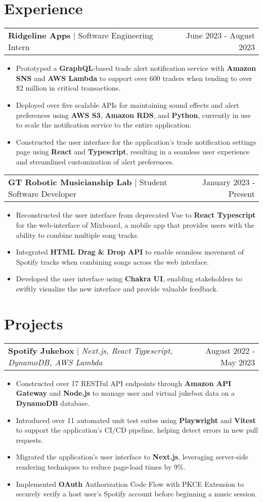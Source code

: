 \documentclass[letterpaper,11pt]{article}
\makeatletter
\newcommand{\resumeExperienceHeading}[3]{
    \begin{tabular*}{0.99\textwidth}[t]{l@{\extracolsep{\fill}}r}
      \textbf{#1} $\vert$ {#2} & {#3} \\
    \end{tabular*}\vspace{-3pt}
}
\newcommand{\resumeProjectHeading}[3]{
    \begin{tabular*}{0.97\textwidth}[t]{l@{\extracolsep{\fill}}r}
      \textbf{#1} $\vert$ \textit{#2}  & {#3}
    \end{tabular*}\vspace{-3pt}
}
\newcommand{\resumeItemListStart}{\begin{itemize}[noitemsep]\vspace{-4pt}}
\newcommand{\resumeItemListEnd}{\end{itemize}}
\makeatother
\begin{document}
\section{Experience}
  \resumeExperienceHeading{Ridgeline Apps}{Software Engineering Intern}{June 2023 - August 2023}
    \resumeItemListStart
      \item {Prototyped a \textbf{GraphQL}-based trade alert notification service with \textbf{Amazon SNS} and \textbf{AWS Lambda} to support over 600 traders when tending to over \$2 million in critical transactions.}
      \item {Deployed over five scalable APIs for maintaining sound effects and alert preferences using \textbf{AWS S3}, \textbf{Amazon RDS}, and \textbf{Python}, currently in use to scale the notification service to the entire application.}
      \item {Constructed the user interface for the application's trade notification settings page using \textbf{React} and \textbf{Typescript}, resulting in a seamless user experience and streamlined customization of alert preferences.}
    \resumeItemListEnd
  \resumeExperienceHeading{GT Robotic Musicianship Lab}{Student Software Developer}{January 2023 - Present}
    \resumeItemListStart
      \item {Reconstructed the user interface from deprecated Vue to \textbf{React Typescript} for the web-interface of Mixboard, a mobile app that provides users with the ability to combine multiple song tracks.}
      \item {Integrated \textbf{HTML Drag \& Drop API} to enable seamless movement of Spotify tracks when combining songs across the web interface.}
      \item {Developed the user interface using \textbf{Chakra UI}, enabling stakeholders to swiftly visualize the new interface and provide valuable feedback.}
    \resumeItemListEnd
  
\section{Projects}
    \resumeProjectHeading{Spotify Jukebox}{Next.js, React Typescript, DynamoDB, AWS Lambda }{August 2022 - May 2023}
      \resumeItemListStart
        \item {Constructed over 17 RESTful API endpoints through \textbf{Amazon API Gateway} and \textbf{Node.js} to manage user and virtual jukebox data on a \textbf{DynamoDB} database.}
        \item {Introduced over 11 automated unit test suites using \textbf{Playwright} and \textbf{Vitest} to support the application's CI/CD pipeline, helping detect errors in new pull requests.}
        \item {Migrated the application's user interface to \textbf{Next.js}, leveraging server-side rendering techniques to reduce page-load times by 9\%.}
        \item {Implemented \textbf{OAuth} Authorization Code Flow with PKCE Extension to securely verify a host user's Spotify account before beginning a music session.}
      \resumeItemListEnd
\end{document}

